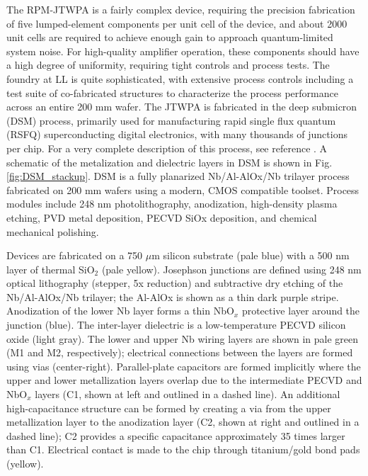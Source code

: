 The RPM-JTWPA is a fairly complex device, requiring the precision fabrication of five lumped-element components per unit cell of the device, and about 2000 unit cells are required to achieve enough gain to approach quantum-limited system noise.  For high-quality amplifier operation, these components should have a high degree of uniformity, requiring tight controls and process tests.  The foundry at LL is quite sophisticated, with extensive process controls including a test suite of co-fabricated structures to characterize the process performance across an entire 200 mm wafer.  The JTWPA is fabricated in the deep submicron (DSM) process, primarily used for manufacturing rapid single flux quantum (RSFQ) superconducting digital electronics, with many thousands of junctions per chip.  For a very complete description of this process, see reference \cite{Tolpygo2014}.  A schematic of the metalization and dielectric layers in DSM is shown in Fig. \ref{fig:DSM_stackup}. DSM is a fully planarized Nb/Al-AlOx/Nb trilayer process fabricated on 200 mm wafers using a modern, CMOS compatible toolset. Process modules include 248 nm photolithography, anodization, high-density plasma etching, PVD metal deposition, PECVD SiOx deposition, and chemical mechanical polishing.

Devices are fabricated on a 750 $\mu$m silicon substrate (pale blue) with a 500 nm layer of thermal SiO$_2$ (pale yellow).  Josephson junctions are defined using 248 nm optical lithography (stepper, 5x reduction) and subtractive dry etching of the Nb/Al-AlOx/Nb trilayer; the Al-AlOx is shown as a thin dark purple stripe.    Anodization of the lower Nb layer forms a thin NbO$_x$ protective layer around the junction (blue).  The inter-layer dielectric is a low-temperature PECVD silicon oxide (light gray).  The lower and upper Nb wiring layers are shown in pale green (M1 and M2, respectively); electrical connections between the layers are formed using vias (center-right).   Parallel-plate capacitors are formed implicitly where the upper and lower metallization layers overlap due to the intermediate PECVD and NbO$_x$ layers (C1, shown at left and outlined in a dashed line).  An additional high-capacitance structure can be formed by creating a via from the upper metallization layer to the anodization layer (C2, shown at right and outlined in a dashed line); C2 provides a specific capacitance approximately 35 times larger than C1.  Electrical contact is made to the chip through titanium/gold bond pads (yellow).

